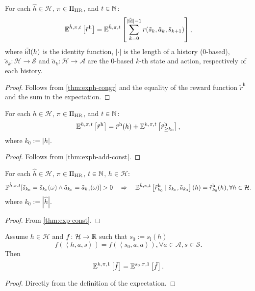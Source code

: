 \begin{theorem}\label{thm:expret-eq-sum-rew}
For each $\hat{h}\in \mathcal{H}$, $\pi \in \Pi_{\mathrm{HR}}$, and $t\in \mathbb{N}$:
\[
\mathbb{E}^{\hat{h}, \pi, t} \left[ \tilde{r}^{\mathrm{h}} \right]
=
\mathbb{E}^{\hat{h}, \pi, t} \left[ \sum_{k=0}^{|\tilde{\operatorname{id}}|-1}  r(\tilde{s}_k, \tilde{a}_k, \tilde{s}_{k+1}) \right],
\]
where $\tilde{\operatorname{id}}(h)$ is the identity function, $|\cdot|$ is the length of a history (0-based), $\tilde{s}_k\colon \mathcal{H} \to \mathcal{S}$ and $\tilde{a}_k\colon \mathcal{H} \to \mathcal{A}$ are the 0-based $k$-th state and action, respectively of each history.
 \leanok
\end{theorem}
\begin{proof}
Follows from \cref{thm:exph-congr} and the equality of the reward function $\tilde{r}^{\mathrm{h}}$ and the sum in the expectation.
\end{proof}

\begin{theorem}\label{thm:sum-rew-eq-sum-rew-rg}
For each $h\in \mathcal{H}$, $\pi \in \Pi_{\mathrm{HR}}$, and $t\in \mathbb{N}$:
\[
\mathbb{E}^{h, \pi, t} \left[  \tilde{r}^{\mathrm{h}} \right]
=
\tilde{r}^{\mathrm{h}}(h) + \mathbb{E}^{h, \pi, t} \left[ \tilde{r}^{\mathrm{h}}_{\ge k_0} \right],
\]
where $k_0:=|h|$.
\end{theorem}
\begin{proof}
Follows from \cref{thm:exph-add-const}.
\end{proof}

\begin{theorem}\label{thm:sum-rew-cnd}
For each $\hat{h}\in \mathcal{H}$, $\pi \in \Pi_{\mathrm{HR}}$, $t\in \mathbb{N}$, $h\in \mathcal{H}$:
\begin{equation*}
  \mathbb{P}^{\hat{h},\pi.t}[\tilde{s}_{k_0}=\tilde{s}_{k_0}(\omega) \wedge \tilde{a}_{k_0} = \tilde{a}_{k_0}(\omega) ] > 0
\quad\Rightarrow \quad
  \mathbb{E}^{\hat{h}, \pi, t} \left[ \tilde{r}^{\mathrm{h}}_{k_0} \mid  \tilde{s}_{k_0}, \tilde{a}_{k_0}\right](h) = \tilde{r}^{\mathrm{h}}_{k_0}(h), \forall h \in \mathcal{H}.
\end{equation*}
where $k_0:= |\hat{h}|$.
\end{theorem}
\begin{proof}
 From \cref{thm:exp-const}. 
\end{proof}

\begin{theorem} \label{thm:exph-horizon-trim}
Assume $h \in \mathcal{H}$ and $f \colon \mathcal{H} \to \mathbb{R}$ such that $s_0 := s_{\mathrm{l}}(h)$
\[
f(\left< h, a, s \right>) = f(\left< s_0, a, a \right>) , \forall a\in \mathcal{A}, s\in \mathcal{S}.
\]
Then
\[
\mathbb{E}^{h,\pi,1}\left[ \tilde{f} \right] =   
\mathbb{E}^{s_0,\pi,1}\left[ \tilde{f} \right].
\]
\end{theorem}
\begin{proof}
  Directly from the definition of the expectation.
\end{proof}

